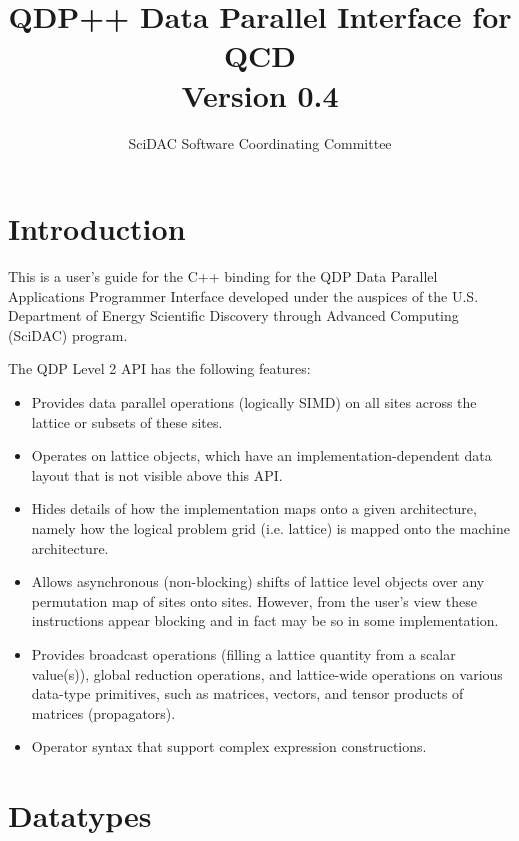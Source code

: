 \documentclass[12pt,letterpaper]{article}
\newcommand{\cpp}{C++}
\begin{document}
\title{
   QDP++ Data Parallel Interface for QCD  \\{\large Version 0.4}
}
\author{SciDAC Software Coordinating Committee}

\maketitle
\section{Introduction}
This is a user's guide for the \cpp{} binding for the QDP Data Parallel
Applications Programmer Interface developed under the auspices of the
U.S. Department of Energy Scientific Discovery through Advanced
Computing (SciDAC) program.

The QDP Level 2 API has the following features:
\begin{itemize}
\item Provides data parallel operations (logically SIMD) on all sites
across the lattice or subsets of these sites.
\item Operates on lattice objects, which have an
implementation-dependent data layout that is not visible above this
API.
\item Hides details of how the implementation maps onto a given
architecture, namely how the logical problem grid (i.e. lattice) is
mapped onto the machine architecture.
\item Allows asynchronous (non-blocking) shifts of lattice level
objects over any permutation map of sites onto sites. However, from
the user's view these instructions appear blocking and in fact may be
so in some implementation.
\item Provides broadcast operations (filling a lattice quantity from a
scalar value(s)), global reduction operations, and lattice-wide
operations on various data-type primitives, such as matrices, vectors,
and tensor products of matrices (propagators).
\item
Operator syntax that support complex expression constructions.
\end{itemize}

\section{Datatypes}
\label{sec.datatypes}
\end{document}
